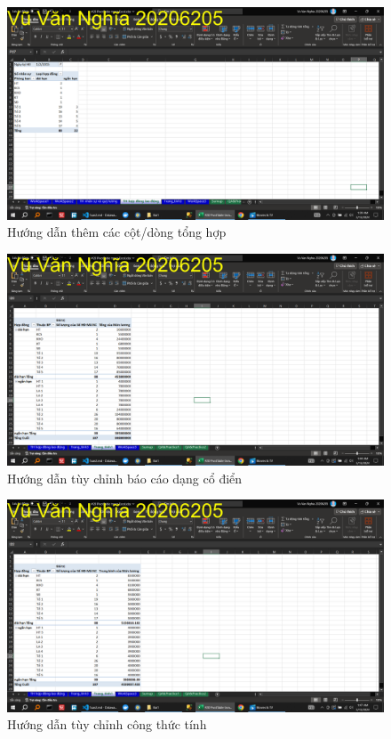 \documentclass{article}
\begin{document}
\begin{figure}[H]
    \centering
    \includegraphics[scale = 0.15]{Bai1/HuongDan/5.png}
    \caption{Hướng dẫn thêm các cột/dòng tổng hợp}
\end{figure}






\begin{figure}[H]
    \centering
    \includegraphics[scale = 0.15]{Bai1/HuongDan/6.png}
    \caption{Hướng dẫn tùy chỉnh báo cáo dạng cổ điển}
\end{figure}






\begin{figure}[H]
    \centering
    \includegraphics[scale = 0.15]{Bai1/HuongDan/7.png}
    \caption{Hướng dẫn tùy chỉnh công thức tính}
\end{figure}
\end{document}
